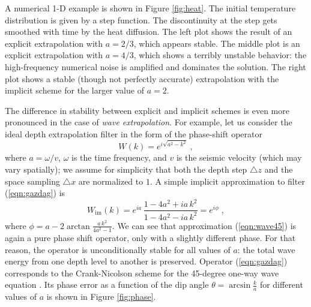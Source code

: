 
\par
A numerical 1-D example is shown in Figure \ref{fig:heat}. The initial
temperature distribution is given by a step function. The
discontinuity at the step gets smoothed with time by the heat
diffusion. The left plot shows the result of an explicit extrapolation
with $a=2/3$, which appears stable. The middle plot is an explicit
extrapolation with $a=4/3$, which shows a terribly unstable behavior:
the high-frequency numerical noise is amplified and dominates the
solution. The right plot shows a stable (though not perfectly
accurate) extrapolation with the implicit scheme for the larger value of
$a=2$.
\par
The difference in stability between explicit and implicit schemes is
even more pronounced in the case of \emph{wave extrapolation}. For
example, let us consider the ideal depth extrapolation filter in the
form of the phase-shift operator
\cite{GEO43.07.13421351,Claerbout.blackwell.85}
\begin{equation}
  \label{eqn:gazdag}
  W (k) = e^{i \sqrt{a^2 - k^2}}\;,
\end{equation}
where $a = \omega / v$, $\omega$ is the time frequency, and $v$ is the
seismic velocity (which may vary spatially); we assume for simplicity
that both the depth step $\triangle z$ and the space sampling
$\triangle x$ are normalized to $1$.  A simple implicit approximation
to filter (\ref{eqn:gazdag}) is
\begin{equation}
  \label{eqn:wave45}
   W_{\mbox{im}} (k) = e^{i a}\,
   \frac{1 -4 a^2 + i a\,k^2}{1 - 4 a^2 - i a\,k^2} = e^{i \phi}\;,
\end{equation}
where $\phi = a - 2 \arctan{\frac{a\,k^2}{4 a^2-1}}$. We can see
that approximation (\ref{eqn:wave45}) is again a pure phase shift
operator, only with a slightly different phase. For that reason, the
operator is unconditionally stable for all values of $a$: the total
wave energy from one depth level to another is preserved. Operator
(\ref{eqn:gazdag}) corresponds to the Crank-Nicolson scheme for the
45-degree one-way wave equation \cite{Claerbout.blackwell.85}. Its
phase error as a function of the dip angle $\theta =
\arcsin{\frac{k}{a}}$ for different values of $a$ is shown in Figure
\ref{fig:phase}.

